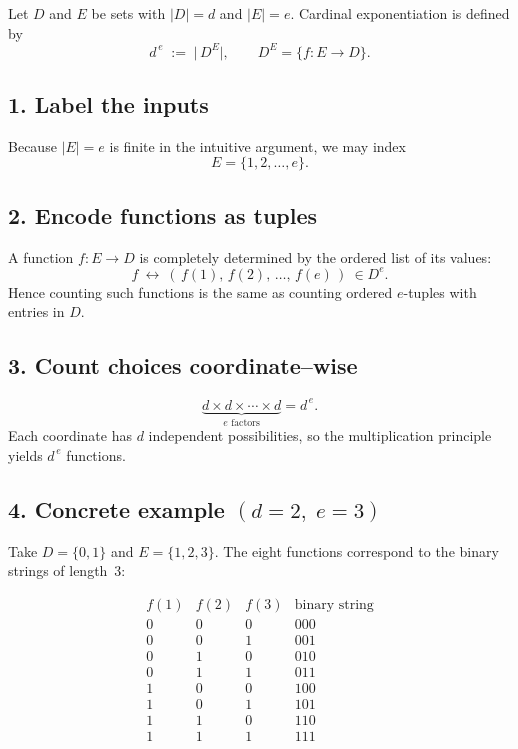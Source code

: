 \documentclass[12pt]{article}
\theoremstyle{definition} %
\theoremstyle{plain} %
\begin{document}
  Let \(D\) and \(E\) be sets with \(|D|=d\) and \(|E|=e\).  
  Cardinal exponentiation is defined by
  \[
    d^{\,e}\;:=\;\bigl|\,D^{E}\bigr|,
    \qquad D^{E}=\{f:E\to D\}.
  \]
  
  \subsection*{1.  Label the inputs}
  Because \(|E|=e\) is finite in the intuitive argument, we may index
  \[
    E=\{1,2,\dots,e\}.
  \]
  
  \subsection*{2.  Encode functions as tuples}
  A function \(f:E\to D\) is completely determined by the ordered list of
  its values:
  \[
    f \ \longleftrightarrow\ (\,f(1),\,f(2),\,\dots,\,f(e)\,)\ \in D^{e}.
  \]
  Hence counting such functions is the same as counting ordered \(e\)-tuples
  with entries in \(D\).
  
  \subsection*{3.  Count choices coordinate--wise}
  \[
    \underbrace{d\times d\times\cdots\times d}_{\text{$e$ factors}}
    = d^{\,e}.
  \]
  Each coordinate has \(d\) independent possibilities, so the
  multiplication principle yields \(d^{\,e}\) functions.
  
  \subsection*{4.  Concrete example \((d=2,\;e=3)\)}
  Take \(D=\{0,1\}\) and \(E=\{1,2,3\}\).
  The eight functions correspond to the binary strings of length~3:
  
  \[
  \begin{array}{c|c|c|c}
  f(1) & f(2) & f(3) & \text{binary string}\\ \hline
  0 & 0 & 0 & 000\\
  0 & 0 & 1 & 001\\
  0 & 1 & 0 & 010\\
  0 & 1 & 1 & 011\\
  1 & 0 & 0 & 100\\
  1 & 0 & 1 & 101\\
  1 & 1 & 0 & 110\\
  1 & 1 & 1 & 111
  \end{array}
  \]
  
\end{document}
